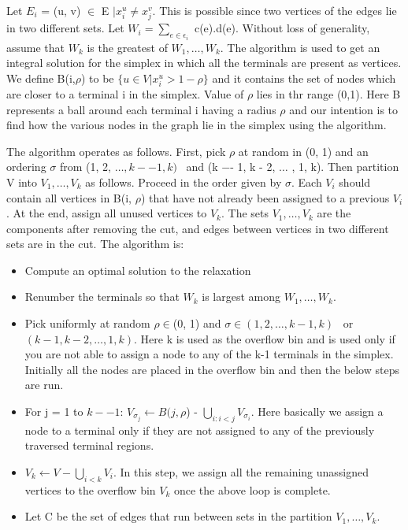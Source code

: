 \documentclass[11pt]{article}
\begin{document}
Let $E_i$ = (u, v) $\in$ E $\vert x_{i}^u \neq x_{j}^v$. This is possible since two vertices of the edges lie in two different sets. Let $W_i = \sum_{e \in \epsilon_i}$ c(e).d(e). Without loss of generality, assume that $W_k$ is the greatest of $W_1, \dots , W_k$. The algorithm is used to get an integral solution for the simplex in which all the terminals are present as vertices. We define B(i,$\rho$) to be $\{u \in V \vert x_i^u > 1 - \rho \}$  and it contains the set of nodes which are closer to a terminal i in the simplex. Value of $\rho$ lies in thr range (0,1). Here B represents a ball around each terminal i having a radius $\rho$ and our intention is to find how the various nodes in the graph lie in the simplex using the algorithm.\\
\vspace{-10pt}

The algorithm operates as follows. First, pick $\rho$ at random in (0, 1) and an ordering $\sigma$ from (1, 2, $\dots, k −- 1, k)$ \ and (k −- 1, k - 2, $\dots$ , 1, k). Then partition V into $ V_1, \dots , V_k$ as follows. Proceed in the order given by $\sigma$. Each $V_i$ should contain all vertices in B(i, $\rho$) that have not already been assigned to a previous $V_i$. At the end, assign all unused vertices to $V_k$. The sets $V_1, \dots , V_k$ are the components after removing the cut, and edges between vertices in two different sets are in the cut. The algorithm is:
\begin{itemize} \itemsep -2pt
\item  Compute an optimal solution to the relaxation
\item Renumber the terminals so that $W_k$ is largest among $W_1, \dots , W_k$.
\item  Pick uniformly at random $\rho \in $(0, 1) and
$\sigma \in (1, 2, \dots , k - 1, k)$ \ or $ (k - 1, k - 2, \dots , 1, k)$. Here k is used as the overflow bin and is used only if you are not able to assign a node to any of the k-1 terminals in the simplex. Initially all the nodes are placed in the overflow bin and then the below steps are run.
\item For j = 1 to $k −- 1$: $V_{\sigma_j} \leftarrow B(j, \rho$) - $\bigcup_{i:i<j} V_{\sigma_i}$. Here basically we assign a node to a terminal only if they are not assigned to any of the previously traversed terminal regions.\
\item $V_k \leftarrow V - \bigcup_{i<k} V_i$. In this step, we assign all the remaining unassigned vertices to the overflow bin $V_k$ once the above loop is complete.

\item Let C be the set of edges that run between sets in the partition $V_1,\dots , V_k$.
\end{itemize}
\end{document}
